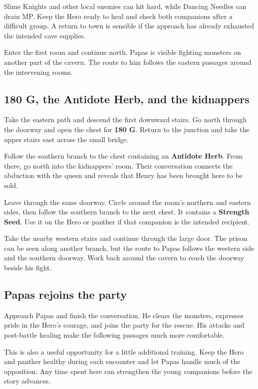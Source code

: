 Slime Knights and other local enemies can hit hard, while Dancing Needles
can drain MP. Keep the Hero ready to heal and check both companions after
a difficult group. A return to town is sensible if the approach has
already exhausted the intended cave supplies.

Enter the first room and continue north. Papas is visible fighting
monsters on another part of the cavern. The route to him follows the
eastern passages around the intervening rooms.

\subsection*{180 G, the Antidote Herb, and the kidnappers}

Take the eastern path and descend the first downward stairs. Go north
through the doorway and open the chest for \textbf{180 G}. Return
to the junction and take the upper stairs east across the small bridge.

Follow the southern branch to the chest containing an
\textbf{Antidote Herb}. From there, go north into the kidnappers' room.
Their conversation connects the abduction with the queen and reveals
that Henry has been brought here to be sold.

Leave through the same doorway. Circle around the room's northern and
eastern sides, then follow the southern branch to the next chest.
It contains a \textbf{Strength Seed}. Use it on the Hero or panther
if that companion is the intended recipient.

Take the nearby western stairs and continue through the large door.
The prison can be seen along another branch, but the route to Papas
follows the western side and the southern doorway. Work back around
the cavern to reach the doorway beside his fight.

\subsection*{Papas rejoins the party}

Approach Papas and finish the conversation. He clears the monsters,
expresses pride in the Hero's courage, and joins the party for the rescue.
His attacks and post-battle healing make the following passages much
more comfortable.

This is also a useful opportunity for a little additional training.
Keep the Hero and panther healthy during each encounter and let Papas
handle much of the opposition. Any time spent here can strengthen the
young companions before the story advances.


